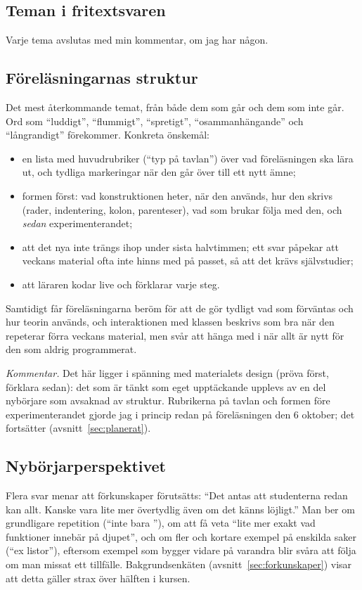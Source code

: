 \documentclass[a4paper]{article}
\begin{document}
\begin{refsection}
\section{Teman i fritextsvaren}

Varje tema avslutas med min kommentar, om jag har någon.

\subsection{Föreläsningarnas struktur}

Det mest återkommande temat, från både dem som går och dem som inte går.
Ord som \enquote{luddigt}, \enquote{flummigt}, \enquote{spretigt},
\enquote{osammanhängande} och \enquote{långrandigt} förekommer. Konkreta
önskemål:
\begin{itemize}
\item en lista med huvudrubriker (\enquote{typ på tavlan}) över vad
  föreläsningen ska lära ut, och tydliga markeringar när den går över till
  ett nytt ämne;
\item formen först: vad konstruktionen heter, när den används, hur den
  skrivs (rader, indentering, kolon, parenteser), vad som brukar följa med
  den, och \emph{sedan} experimenterandet;
\item att det nya inte trängs ihop under sista halvtimmen; ett svar påpekar
  att veckans material ofta inte hinns med på passet, så att det krävs
  självstudier;
\item att läraren kodar live och förklarar varje steg.
\end{itemize}
Samtidigt får föreläsningarna beröm för att de gör tydligt vad som
förväntas och hur teorin används, och interaktionen med klassen beskrivs
som bra när den repeterar förra veckans material, men svår att hänga med
i när allt är nytt för den som aldrig programmerat.

\emph{Kommentar.} Det här ligger i spänning med materialets design
(pröva först, förklara sedan): det som är tänkt som eget upptäckande
upplevs av en del nybörjare som avsaknad av struktur. Rubrikerna på tavlan
och formen före experimenterandet gjorde jag i princip redan på
föreläsningen den 6 oktober; det fortsätter (avsnitt~\ref{sec:planerat}).

\subsection{Nybörjarperspektivet}

Flera svar menar att förkunskaper förutsätts: \enquote{Det antas att
studenterna redan kan allt. Kanske vara lite mer övertydlig även om det
känns löjligt.} Man ber om grundligare repetition (\enquote{inte bara
}), om att få veta
\enquote{lite mer exakt vad funktioner innebär på djupet}, och om
fler och kortare exempel på enskilda saker (\enquote{ex listor}), eftersom
exempel som bygger vidare på varandra blir svåra att följa om man missat
ett tillfälle. Bakgrundsenkäten (avsnitt~\ref{sec:forkunskaper}) visar
att detta gäller strax över hälften i kursen.


\end{refsection}
\end{document}
